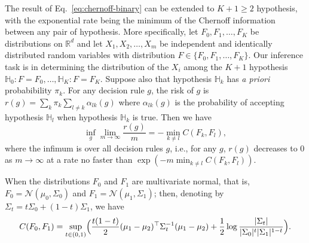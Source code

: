 \documentclass[11pt]{extarticle}
\begin{document}
The result of Eq.~\eqref{eq:chernoff-binary} can be extended to $K + 1 \geq 2$ hypothesis, with the exponential rate being the minimum of the Chernoff information between any pair of hypothesis. More specifically, let $F_0, F_1, \dots, F_{K}$ be distributions on $\mathbb{R}^{d}$ and let $X_1, X_2, \dots, X_m$ be independent and identically distributed random variables with distribution $F \in \{F_0, F_1, \dots, F_K\}$. Our inference task is in determining the distribution of the $X_i$ among the $K+1$ hypothesis $\mathbb{H}_0 \colon F = F_0, \dots, \mathbb{H}_{K} \colon F = F_K$.
Suppose also that hypothesis $\mathbb{H}_k$ has {\em a priori} probabibility $\pi_k$. For any decision rule $g$, the risk of $g$ is $r(g) = \sum_{k} \pi_k \sum_{l \not = k} \alpha_{lk}(g) $ where $\alpha_{lk}(g)$ is the probability of accepting hypothesis $\mathbb{H}_l$ when hypothesis $\mathbb{H}_k$ is true. Then we have \cite{leang-johnson}
\begin{equation}
\label{eq:chernoff-multiple}
\inf_{g} \lim_{m \rightarrow \infty}  \frac{r(g)}{m} = - \min_{k \not = l} C(F_k, F_l),
\end{equation}
where the infimum is over all decision rules $g$, i.e., for any $g$, $r(g)$ decreases to $0$ as $m \rightarrow \infty$ at a rate no faster than $\exp(- m \min_{k \not = l} C(F_k, F_l))$.

When the distributions $F_0$ and $F_1$ are multivariate normal, that is, $F_0 =  \mathcal{N}(\mu_0, \Sigma_0)$ and $F_1 = \mathcal{N}(\mu_1, \Sigma_1)$; then, denoting by $\Sigma_t = t \Sigma_0 + (1 - t) \Sigma_1$, we have
\begin{equation*}
C(F_0, F_1) = \sup_{t \in (0,1)} \Bigl(\frac{t(1 - t)}{2} (\mu_1 - \mu_2)^{\top}\Sigma_t^{-1}(\mu_1 - \mu_2) + \frac{1}{2} \log \frac{|\Sigma_t|}{|\Sigma_0|^{t} |\Sigma_1|^{1 - t}}  \Bigr).
\end{equation*}
\end{document}
